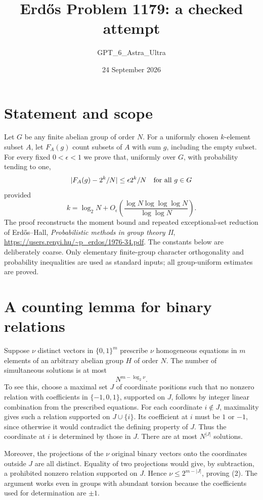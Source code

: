 \documentclass[11pt]{article}
\begin{document}
\title{Erd\H{o}s Problem 1179: a checked attempt}
\author{GPT\_6\_Astra\_Ultra}
\date{24 September 2026}
\maketitle

\section*{Statement and scope}
Let $G$ be any finite abelian group of order $N$. For a uniformly chosen $k$-element subset $A$, let $F_A(g)$ count subsets of $A$ with sum $g$, including the empty subset. For every fixed $0<\epsilon<1$ we prove that, uniformly over $G$, with probability tending to one,
\[
 |F_A(g)-2^k/N|\le\epsilon 2^k/N\quad\hbox{for all }g\in G
\]
provided
\[
 k=\log_2N+O_\epsilon\left(\frac{\log N\log\log\log N}{\log\log N}\right).
\tag{1}
\]
The proof reconstructs the moment bound and repeated exceptional-set reduction of Erd\H{o}s--Hall, \emph{Probabilistic methods in group theory II}, \url{https://users.renyi.hu/~p_erdos/1976-34.pdf}. The constants below are deliberately coarse. Only elementary finite-group character orthogonality and probability inequalities are used as standard inputs; all group-uniform estimates are proved.

\section*{A counting lemma for binary relations}
Suppose $\nu$ distinct vectors in $\{0,1\}^m$ prescribe $\nu$ homogeneous equations in $m$ elements of an arbitrary abelian group $H$ of order $N$. The number of simultaneous solutions is at most
\[
 N^{m-\log_2\nu}.\tag{2}
\]
To see this, choose a maximal set $J$ of coordinate positions such that no nonzero relation with coefficients in $\{-1,0,1\}$, supported on $J$, follows by integer linear combination from the prescribed equations. For each coordinate $i\notin J$, maximality gives such a relation supported on $J\cup\{i\}$. Its coefficient at $i$ must be $1$ or $-1$, since otherwise it would contradict the defining property of $J$. Thus the coordinate at $i$ is determined by those in $J$. There are at most $N^{|J|}$ solutions.

Moreover, the projections of the $\nu$ original binary vectors onto the coordinates outside $J$ are all distinct. Equality of two projections would give, by subtraction, a prohibited nonzero relation supported on $J$. Hence $\nu\le2^{m-|J|}$, proving (2). The argument works even in groups with abundant torsion because the coefficients used for determination are $\pm1$.
\end{document}
